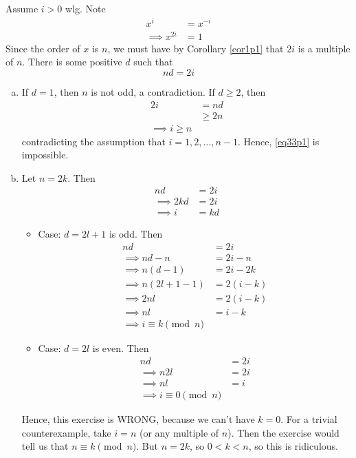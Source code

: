 \documentclass{article}
\begin{document}
\subsubsection{}\label{ex1p33}
Assume $i > 0$ wlg. Note
\begin{align}
x^i &= x^{-i} \label{eq33p1} \\
\implies x^{2i} &= 1 \label{eq33p2}
\end{align}
Since the order of $x$ is $n$, we must have by Corollary \ref{cor1p1} that $2i$ is a multiple of $n$. There is some positive $d$ such that
\begin{equation*}
nd = 2i \label{eq33p3}
\end{equation*}
\begin{enumerate}[(a)]
\item If $d=1$, then $n$ is not odd, a contradiction. If $d \geq 2$, then \label{ex1p33a}
\begin{align*}
2i &= nd\\
&\geq 2n\\
\implies i \geq n
\end{align*}
contradicting the assumption that $i=1,2,\ldots,n-1$. Hence, \eqref{eq33p1} is impossible.
\item Let $n=2k$. Then \label{ex1p33b}
\begin{align*}
nd &= 2i\\
\implies 2kd &= 2i\\
\implies i &= kd
\end{align*}
\begin{itemize}
\item Case: $d = 2l+1$ is odd. Then
\begin{align*}
nd &= 2i\\
\implies nd -n &= 2i - n\\
\implies n(d -1) &= 2i - 2k\\
\implies n(2l+1 -1) &= 2(i - k)\\
\implies 2nl &= 2(i - k)\\
\implies nl &= i - k\\
\implies i \equiv k \pmod{n}
\end{align*}
\item Case: $d = 2l$ is even. Then
\begin{align*}
nd &= 2i\\
\implies n2l &= 2i\\
\implies nl &= i\\
\implies i \equiv 0 \pmod{n}
\end{align*}
\end{itemize}
Hence, this exercise is WRONG, because we can't have $k=0$. For a trivial counterexample, take $i=n$ (or any multiple of $n$). Then the exercise would tell us that $n \equiv k \pmod{n}$. But $n=2k$, so $0<k<n$, so this is ridiculous.
\end{enumerate}
\end{document}
